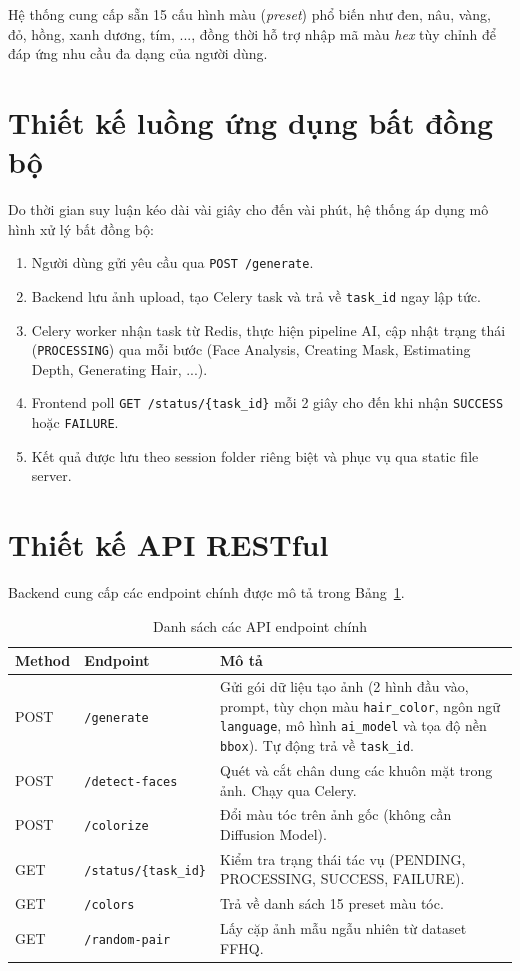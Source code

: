 \documentclass[../main.tex]{subfiles}
\begin{document}
Hệ thống cung cấp sẵn 15 cấu hình màu (\textit{preset}) phổ biến như đen, nâu, vàng, đỏ, hồng, xanh dương, tím, ..., đồng thời hỗ trợ nhập mã màu \textit{hex} tùy chỉnh để đáp ứng nhu cầu đa dạng của người dùng.

\section{Thiết kế luồng ứng dụng bất đồng bộ}
Do thời gian suy luận kéo dài vài giây cho đến vài phút, hệ thống áp dụng mô hình xử lý bất đồng bộ:
\begin{enumerate}
    \item Người dùng gửi yêu cầu qua \texttt{POST /generate}.
    \item Backend lưu ảnh upload, tạo Celery task và trả về \texttt{task\_id} ngay lập tức.
    \item Celery worker nhận task từ Redis, thực hiện pipeline AI, cập nhật trạng thái (\texttt{PROCESSING}) qua mỗi bước (Face Analysis, Creating Mask, Estimating Depth, Generating Hair, ...).
    \item Frontend poll \texttt{GET /status/\{task\_id\}} mỗi 2 giây cho đến khi nhận \texttt{SUCCESS} hoặc \texttt{FAILURE}.
    \item Kết quả được lưu theo session folder riêng biệt và phục vụ qua static file server.
\end{enumerate}

\section{Thiết kế API RESTful}
Backend cung cấp các endpoint chính được mô tả trong Bảng~\ref{tab:api-endpoints}.

\begin{table}[H]
    \centering
    \caption{Danh sách các API endpoint chính}
    \label{tab:api-endpoints}
    \begin{tabularx}{\textwidth}{|>{\raggedright\arraybackslash}p{1.5cm}|>{\raggedright\arraybackslash}p{3.5cm}|X|}
        \hline
        \textbf{Method} & \textbf{Endpoint} & \textbf{Mô tả} \\
        \hline
        POST & \texttt{/generate} & Gửi gói dữ liệu tạo ảnh (2 hình đầu vào, prompt, tùy chọn màu \texttt{hair\_color}, ngôn ngữ \texttt{language}, mô hình \texttt{ai\_model} và tọa độ nền \texttt{bbox}). Tự động trả về \texttt{task\_id}. \\
        \hline
        POST & \texttt{/detect-faces} & Quét và cắt chân dung các khuôn mặt trong ảnh. Chạy qua Celery. \\
        \hline
        POST & \texttt{/colorize} & Đổi màu tóc trên ảnh gốc (không cần Diffusion Model). \\
        \hline
        GET & \texttt{/status/\{task\_id\}} & Kiểm tra trạng thái tác vụ (PENDING, PROCESSING, SUCCESS, FAILURE). \\
        \hline
        GET & \texttt{/colors} & Trả về danh sách 15 preset màu tóc. \\
        \hline
        GET & \texttt{/random-pair} & Lấy cặp ảnh mẫu ngẫu nhiên từ dataset FFHQ. \\
        \hline
    \end{tabularx}
\end{table}
\end{document}
